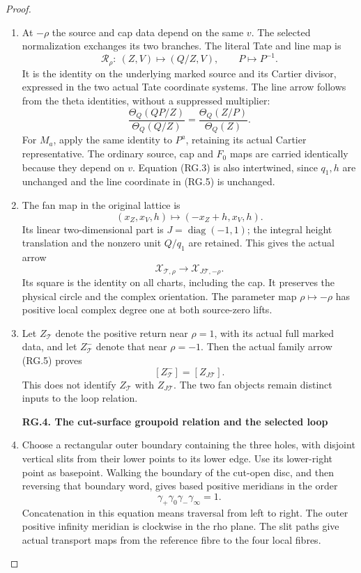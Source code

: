 \begin{proof}
\begin{enumerate}[label=\arabic*.]
\item At \(-\rho\) the source and cap data depend on the same \(v\).
The selected normalization exchanges its two branches. The
literal Tate and line map is
\[
 \mathcal R_\rho:\ (Z,V)\longmapsto(Q/Z,V),
 \qquad P\longmapsto P^{-1}.                          \tag{RG.5}
\]
It is the identity on the underlying marked source and its
Cartier divisor, expressed in the two actual Tate coordinate
systems. The line arrow follows from the theta identities,
without a suppressed multiplier:
\[
 \frac{\Theta_Q(QP/Z)}{\Theta_Q(Q/Z)}
       =\frac{\Theta_Q(Z/P)}{\Theta_Q(Z)}.
\]
For \(M_a\), apply the same identity to \(P^a\), retaining its
actual Cartier representative. The ordinary source, cap and
\(F_0\) maps are carried identically because they depend on
\(v\). Equation (RG.3) is also intertwined, since \(q_1,h\) are
unchanged and the line coordinate in (RG.5) is unchanged.

\item The fan map in the original lattice is
\[
 (x_Z,x_V,h)\longmapsto(-x_Z+h,x_V,h).
\]
Its linear two-dimensional part is
\(J=\operatorname{diag}(-1,1)\); the integral height translation
and the nonzero unit \(Q/q_1\) are retained. This gives the
actual arrow
\[
 \mathcal X_{\mathcal T,\rho}\longrightarrow
             \mathcal X_{J\mathcal T,-\rho}.
\]
Its square is the identity on all charts, including the cap.
It preserves the physical circle and the complex orientation.
The parameter map \(\rho\mapsto-\rho\) has positive local
complex degree one at both source-zero lifts.

\item Let \(Z_{\mathcal T}\) denote the positive return near
\(\rho=1\), with its actual full marked data, and let
\(Z^-_{\mathcal T}\) denote that near \(\rho=-1\). Then the
actual family arrow (RG.5) proves
\[
                  [Z^-_{\mathcal T}]=[Z_{J\mathcal T}]. \tag{RG.6}
\]
This does not identify \(Z_{\mathcal T}\) with
\(Z_{J\mathcal T}\). The two fan objects remain distinct inputs
to the loop relation.

\par

\medskip\noindent\textbf{RG.4. The cut-surface groupoid relation and the selected loop}

\par\nobreak

\item Choose a rectangular outer boundary containing the three holes,
with disjoint vertical slits from their lower points to its
lower edge. Use its lower-right point as basepoint. Walking the
boundary of the cut-open disc, and then reversing that boundary
word, gives based positive meridians in the order
\[
             \gamma_+\gamma_0\gamma_-\gamma_\infty=1. \tag{RG.7}
\]
Concatenation in this equation means traversal from left to
right. The outer positive infinity meridian is clockwise in
the rho plane. The slit paths give actual transport maps from
the reference fibre to the four local fibres.


\end{enumerate}
\end{proof}

